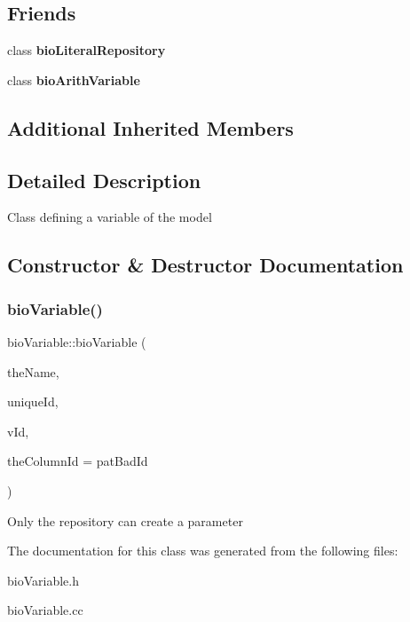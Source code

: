 \subsection*{Friends}
\begin{DoxyCompactItemize}
\item 
\mbox{\label{classbio_variable_a6ea664ca897010b84852832942ab0274}} 
class {\bfseries bio\+Literal\+Repository}
\item 
\mbox{\label{classbio_variable_aa16258a7e505da2ffcb1ffe93770db5c}} 
class {\bfseries bio\+Arith\+Variable}
\end{DoxyCompactItemize}
\subsection*{Additional Inherited Members}


\subsection{Detailed Description}
Class defining a variable of the model 

\subsection{Constructor \& Destructor Documentation}
\mbox{\label{classbio_variable_a9589f9c33ad274d73c88b60ae2524484}} 
\subsubsection{\texorpdfstring{bio\+Variable()}{bioVariable()}}
{\footnotesize\ttfamily bio\+Variable\+::bio\+Variable (\begin{DoxyParamCaption}\item[{pat\+String}]{the\+Name,  }\item[{pat\+U\+Long}]{unique\+Id,  }\item[{pat\+U\+Long}]{v\+Id,  }\item[{pat\+U\+Long}]{the\+Column\+Id = {\ttfamily patBadId} }\end{DoxyParamCaption})\hspace{0.3cm}{\ttfamily [protected]}}

Only the repository can create a parameter 

The documentation for this class was generated from the following files\+:\begin{DoxyCompactItemize}
\item 
bio\+Variable.\+h\item 
bio\+Variable.\+cc\end{DoxyCompactItemize}
